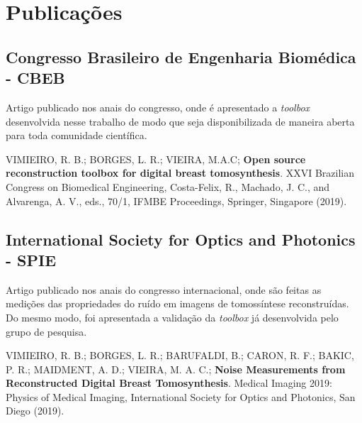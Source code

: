 \chapter[Publicações]{Publicações}\label{Capitulo9}

\section{Congresso Brasileiro de Engenharia Biomédica - CBEB}

Artigo publicado nos anais do congresso, onde é apresentado a \textit{toolbox} desenvolvida nesse trabalho de modo que seja disponibilizada de maneira aberta para toda comunidade científica.

VIMIEIRO, R. B.; BORGES, L. R.; VIEIRA, M.A.C; \textbf{Open source reconstruction toolbox for digital breast tomosynthesis}. XXVI Brazilian Congress on Biomedical Engineering, Costa-Felix, R., Machado,
J. C., and Alvarenga, A. V., eds., 70/1, IFMBE Proceedings, Springer, Singapore (2019).


\section{International Society for Optics and Photonics - SPIE}

Artigo publicado nos anais do congresso internacional, onde são feitas as medições das propriedades do ruído em imagens de tomossíntese reconstruídas. Do mesmo modo, foi apresentada a validação da \textit{toolbox} já desenvolvida pelo grupo de pesquisa.

VIMIEIRO, R. B.; BORGES, L. R.; BARUFALDI, B.; CARON, R. F.; BAKIC, P. R.; MAIDMENT, A. D.; VIEIRA, M. A. C.; \textbf{Noise Measurements from Reconstructed Digital Breast Tomosynthesis}. Medical
Imaging 2019: Physics of Medical Imaging, International Society for Optics and Photonics, San Diego
(2019).

